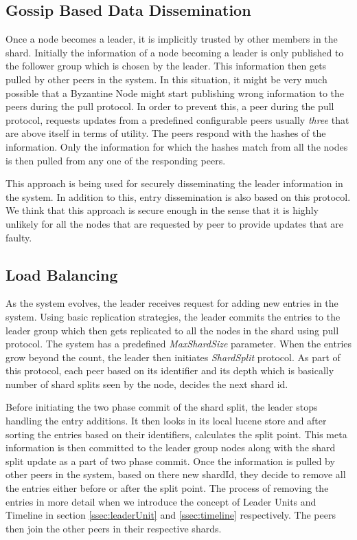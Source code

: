 \documentclass[12pt,a4paper,twoside,openright]{book}
\begin{document}
\subsection{Gossip Based Data Dissemination}
\label{ssec:gossip}
Once a node becomes a leader, it is implicitly trusted by other members in the shard. Initially the information of a node becoming a leader is only published to the follower group which is chosen by the leader. This information then gets pulled by other peers in the system. In this situation, it might be very much possible that a Byzantine Node might start publishing wrong information to the peers during the pull protocol. In order to prevent this, a peer during the pull protocol, requests updates from a predefined configurable peers usually \textit{three} that are above itself in terms of utility.  The peers respond with the hashes of the information. Only the information for which the hashes match from all the nodes is then pulled from any one of the responding peers. 
\par This approach is being used for securely disseminating the leader information in the system. In addition to this, entry dissemination is also based on this protocol. We think that this approach is secure enough in the sense that it is highly unlikely for all the nodes that are requested by peer to provide updates that are faulty.


\subsection{Load Balancing}
\label{ssec:loadBalance}
As the system evolves, the leader receives request for adding new entries in the system. Using basic replication strategies, the leader commits the entries to the leader group which then gets replicated to all the nodes in the shard using pull protocol. The system has a predefined \textit{MaxShardSize} parameter. When the entries grow beyond the count, the leader then initiates \textit{ShardSplit} protocol. As part of this protocol, each peer based on its identifier and its depth which is basically number of shard splits seen by the node, decides the next shard id. 
\par Before initiating the two phase commit of the shard split, the leader stops handling the entry additions. It then looks in its local lucene store and after sorting the entries based on their identifiers, calculates the split point. This meta information is then committed to the leader group nodes along with the shard split update as a part of two phase commit. Once the information is pulled by other peers in the system, based on there new shardId, they decide to remove all the entries either before or after the split point. The process of removing the entries in more detail when we introduce the concept of Leader Units and Timeline in section \ref{ssec:leaderUnit} and \ref{ssec:timeline} respectively. The peers then join the other peers in their respective shards. 
\end{document}

